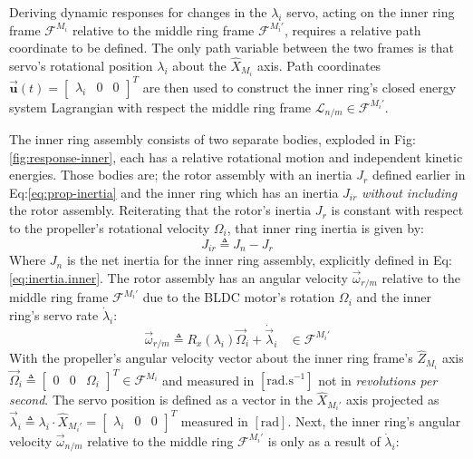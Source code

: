 \par
Deriving dynamic responses for changes in the $\lambda_i$ servo, acting on the inner ring frame $\mathcal{F}^{M_i}$ relative to the middle ring frame $\mathcal{F}^{M_i'}$, requires a relative path coordinate to be defined. The only path variable between the two frames is that servo's rotational position $\lambda_i$ about the $\hat{X}_{M_i}$ axis. Path coordinates $\vec{\mathbf{u}}(t)=\begin{bmatrix}\lambda_i&0&0\end{bmatrix}^T$ are then used to construct the inner ring's closed energy system Lagrangian with respect the middle ring frame $\mathcal{L}_{n/m}\in\mathcal{F}^{M_i'}$.
\par
The inner ring assembly consists of two separate bodies, exploded in Fig:\ref{fig:response-inner}, each has a relative rotational motion and independent kinetic energies. Those bodies are; the rotor assembly with an inertia $J_{r}$ defined earlier in Eq:\ref{eq:prop-inertia} and the inner ring which has an inertia $J_{ir}$ \emph{without including} the rotor assembly. Reiterating that the rotor's inertia $J_r$ is constant with respect to the propeller's rotational velocity $\Omega_i$, that inner ring inertia is given by:
\begin{equation}
J_{ir}\triangleq J_{n}-J_{r}
\end{equation} 
Where $J_n$ is the net inertia for the inner ring assembly, explicitly defined in Eq:\ref{eq:inertia.inner}. The rotor assembly has an angular velocity $\vec{\omega}_{r/m}$ relative to the middle ring frame $\mathcal{F}^{M_i'}$ due to the BLDC motor's rotation $\Omega_i$ and the inner ring's servo rate $\dot{\lambda}_i$:
\begin{equation}\label{eq:angular-rot}
\vec{\omega}_{r/m}\triangleq R_x(\lambda_i)\vec{\Omega}_i+\dot{\vec{\lambda}}_i~~~~\in\mathcal{F}^{M_i'}
\end{equation}
With the propeller's angular velocity vector about the inner ring frame's $\hat{Z}_{M_i}$ axis $\vec{\Omega}_i\triangleq\begin{bmatrix}0 & 0 & \Omega_i\end{bmatrix}^T\in\mathcal{F}^{M_i}$ and measured in $[\text{rad.s}^{-1}]$ not in \emph{revolutions per second}. The servo position is defined as a vector in the $\hat{X}_{M_i'}$ axis projected as $\vec{\lambda}_i\triangleq \lambda_i\cdot\hat{X}_{M_i'}=\begin{bmatrix}\lambda_i & 0 & 0\end{bmatrix}^T$ measured in $[\text{rad}]$. Next, the inner ring's angular velocity $\vec{\omega}_{n/m}$ relative to the middle ring $\mathcal{F}^{M_i'}$ is only as a result of $\dot{\lambda}_i$:
